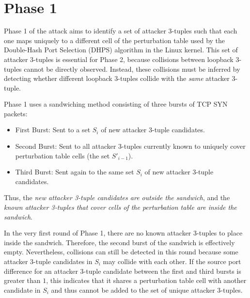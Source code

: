 \documentclass{report}
\begin{document}
\section{Phase 1}
\label{sec:phase 1}


Phase 1 of the attack aims to identify a set of attacker 3-tuples such that each one maps uniquely to a different cell of the perturbation table used by the Double-Hash Port Selection (DHPS) algorithm in the Linux kernel. This set of attacker 3-tuples is essential for Phase 2, because collisions between loopback 3-tuples cannot be directly observed. Instead, these collisions must be inferred by detecting whether different loopback 3-tuples collide with the \emph{same} attacker 3-tuple.


Phase 1 uses a \alert{sandwiching method} consisting of three bursts of TCP SYN packets:

\begin{itemize}
	\item \alert{First Burst:} Sent to a set $S_i$ of new attacker 3-tuple candidates.
	\item \alert{Second Burst:} Sent to all attacker 3-tuples currently known to uniquely cover perturbation table cells (the set $S'_{i-1}$).
	\item \alert{Third Burst:} Sent again to the same set $S_i$ of new attacker 3-tuple candidates.
\end{itemize}

Thus, the \emph{new attacker 3-tuple candidates are outside the sandwich}, and the \emph{known attacker 3-tuples that cover cells of the perturbation table are inside the sandwich}.


In the very first round of Phase 1, there are no known attacker 3-tuples to place inside the sandwich. Therefore, the second burst of the sandwich is effectively empty. Nevertheless, collisions can still be detected in this round because some attacker 3-tuple candidates in $S_i$ may collide with each other. If the source port difference for an attacker 3-tuple candidate between the first and third bursts is greater than $1$, this indicates that it shares a perturbation table cell with another candidate in $S_i$ and thus cannot be added to the set of unique attacker 3-tuples.
\end{document}
